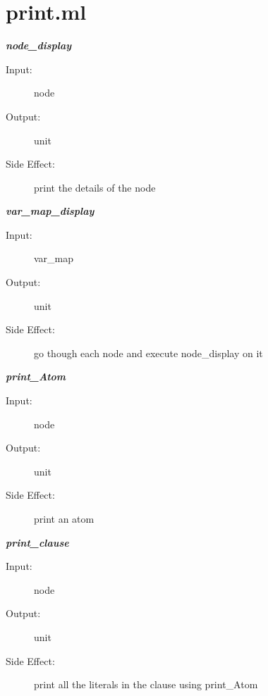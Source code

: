 \documentclass[12pt]{article}
\begin{document}
\section{print.ml}

\begin{description}
    
\item \textbf{\textit{node\_display}}
\begin{description}
    \item[Input:] node
    \item[Output:] unit
    \item[Side Effect:] print the details of the node
\end{description}

\item \textbf{\textit{var\_map\_display}}
\begin{description}
    \item[Input:] var\_map
    \item[Output:] unit
    \item[Side Effect:] go though each node and execute node\_display on it
\end{description}

\item \textbf{\textit{print\_Atom}}
\begin{description}
    \item[Input:] node
    \item[Output:] unit
    \item[Side Effect:] print an atom
\end{description}

\item \textbf{\textit{print\_clause}}
\begin{description}
    \item[Input:] node
    \item[Output:] unit
    \item[Side Effect:] print all the literals in the clause using print\_Atom
\end{description}

\end{description}
\end{document}
